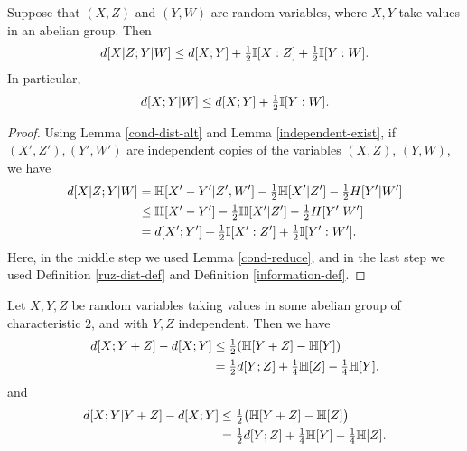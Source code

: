 \begin{lemma}\label{cond-dist-fact}
  \leanok
  Suppose that $(X, Z)$ and $(Y, W)$ are random variables, where $X, Y$ take values in an abelian group. Then
  \[   d[X  | Z;Y | W] \leq d[X ; Y] + \tfrac{1}{2}  \mathbb{I}[X : Z] + \tfrac{1}{2}  \mathbb{I}[Y : W].\]
  In particular,
  \[   d[X ;Y | W] \leq d[X ; Y] + \tfrac{1}{2}  \mathbb{I}[Y : W].\]
\end{lemma}

\begin{proof}
\leanok
Using Lemma \ref{cond-dist-alt} and Lemma \ref{independent-exist}, if $(X',Z'), (Y',W')$ are independent copies of the variables $(X,Z)$, $(Y,W)$, we have
\begin{align*}
  d[X  | Z; Y | W]&= \mathbb{H}[X'-Y'|Z',W'] - \tfrac{1}{2} \mathbb{H}[X'|Z'] - \tfrac{1}{2}H[Y'|W'] \\
                       &\le \mathbb{H}[X'-Y']- \tfrac{1}{2} \mathbb{H}[X'|Z'] - \tfrac{1}{2}H[Y'|W'] \\
                       &= d[X';Y'] + \tfrac{1}{2}  \mathbb{I}[X' : Z'] + \tfrac{1}{2}  \mathbb{I}[Y' : W'].
\end{align*}
Here, in the middle step we used Lemma \ref{cond-reduce}, and in the last step we used Definition \ref{ruz-dist-def} and Definition \ref{information-def}.
\end{proof}

\begin{lemma}\label{first-useful}
  \leanok
  Let $X, Y, Z$ be random variables taking values in some abelian group of characteristic $2$, and with $Y, Z$ independent. Then we have
  \begin{align}\nonumber d[X ; Y + Z] -d[X ; Y] &  \leq \tfrac{1}{2} (\mathbb{H}[Y+ Z] - \mathbb{H}[Y]) \\ & = \tfrac{1}{2} d[Y; Z] + \tfrac{1}{4} \mathbb{H}[Z] - \tfrac{1}{4} \mathbb{H}[Y]. \label{lem51-a} \end{align}
  and
  \begin{align}\nonumber
  d[X ;Y|Y+ Z] - d[X ;Y] & \leq \tfrac{1}{2} \bigl(\mathbb{H}[Y+ Z] - \mathbb{H}[Z]\bigr) \\ & = \tfrac{1}{2} d[Y;Z] + \tfrac{1}{4} \mathbb{H}[Y] - \tfrac{1}{4} \mathbb{H}[Z].
    \label{ruzsa-3}
  \end{align}
  \end{lemma}


